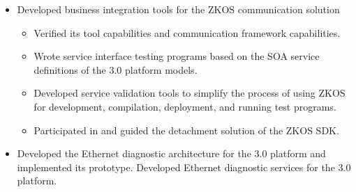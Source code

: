 \documentclass[10pt,a4paper,mono,final]{moderncv}   %
\begin{document}
\begin{CJK*}{UTF8}{gbsn}
{\begin{itemize}
\begin{itemize}
    \item Designed various business integration and automation tools based on the inconvenience of using development prototype interfaces. Combined with ADB and ROS routers, these tools enabled the development computer to access the prototype network, facilitating simulation integration and debugging of services.
    \end{itemize}
  \item Developed business integration tools for the ZKOS communication solution
    \begin{itemize}
    \item Verified its tool capabilities and communication framework capabilities.
    \item Wrote service interface testing programs based on the SOA service definitions of the 3.0 platform models.
    \item Developed service validation tools to simplify the process of using ZKOS for development, compilation, deployment, and running test programs.
    \item Participated in and guided the detachment solution of the ZKOS SDK.
    \end{itemize}
  \item Developed the Ethernet diagnostic architecture for the 3.0 platform and implemented its prototype. Developed Ethernet diagnostic services for the 3.0 platform.
  \end{itemize}
}
\end{CJK*}
\end{document}
